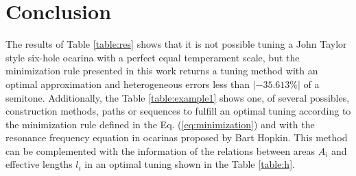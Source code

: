 \documentclass[11pt,twocolumn]{article}
\begin{document}
\begin{table}[h]
\center
{}
\caption{Proposed tuning method.}
\label{table:example1}
\end{table}


\section{Conclusion}
The results of Table \ref{table:res} shows that it is not possible tuning a John Taylor style six-hole ocarina with a perfect equal temperament scale,
but the minimization rule presented in this work returns a tuning method with an optimal approximation and heterogeneous errors less than $|-35.613\%|$ of a semitone.
Additionally, the Table \ref{table:example1} shows one, of several possibles, construction methods, 
paths or sequences to fulfill an optimal tuning according to the minimization rule defined in the Eq. (\ref{eq:minimization}) and with 
the resonance frequency equation in ocarinas proposed by Bart Hopkin.
This method can be complemented with the information of the relations between areas $A_i$ and effective lengths $l_i$ 
in an optimal tuning shown in the Table \ref{table:h}.





\end{document}

